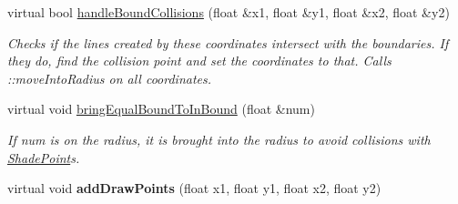 \begin{DoxyCompactItemize}
virtual bool \hyperlink{classlighting_1_1CircleLightSource_a7e0946ab60f06af4f77b9b65e73ab3f3}{handle\+Bound\+Collisions} (float \&x1, float \&y1, float \&x2, float \&y2)
\begin{DoxyCompactList}\small\item\em Checks if the lines created by these coordinates intersect with the boundaries. If they do, find the collision point and set the coordinates to that. Calls \+::move\+Into\+Radius on all coordinates. \end{DoxyCompactList}\item 
virtual void \hyperlink{classlighting_1_1CircleLightSource_af8866a49ad68c131c15c67ae622a1ecf}{bring\+Equal\+Bound\+To\+In\+Bound} (float \&num)
\begin{DoxyCompactList}\small\item\em If num is on the radius, it is brought into the radius to avoid collisions with \hyperlink{classlighting_1_1ShadePoint}{Shade\+Point}s. \end{DoxyCompactList}\item 
virtual void {\bfseries add\+Draw\+Points} (float x1, float y1, float x2, float y2)\hypertarget{classlighting_1_1CircleLightSource_a98ef03cb0c9cb276fa8cd66bbd3a8dc5}{}\label{classlighting_1_1CircleLightSource_a98ef03cb0c9cb276fa8cd66bbd3a8dc5}


\end{DoxyCompactItemize}

